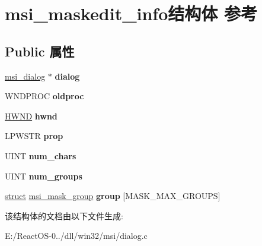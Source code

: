 \hypertarget{structmsi__maskedit__info}{}\section{msi\+\_\+maskedit\+\_\+info结构体 参考}
\label{structmsi__maskedit__info}
\subsection*{Public 属性}
\begin{DoxyCompactItemize}
\item 
\mbox{\label{structmsi__maskedit__info_a68fb34ce5ce1df7808c1a757143a99c0}} 
\hyperlink{structmsi__dialog__tag}{msi\+\_\+dialog} $\ast$ {\bfseries dialog}
\item 
\mbox{\label{structmsi__maskedit__info_a80ae6863e2e7d09501b8bca104b6f346}} 
W\+N\+D\+P\+R\+OC {\bfseries oldproc}
\item 
\mbox{\label{structmsi__maskedit__info_a14ae5d4fe284b729fadc5fe37539e6c1}} 
\hyperlink{interfacevoid}{H\+W\+ND} {\bfseries hwnd}
\item 
\mbox{\label{structmsi__maskedit__info_a30f2e6b4334fc421293b0c61132a897a}} 
L\+P\+W\+S\+TR {\bfseries prop}
\item 
\mbox{\label{structmsi__maskedit__info_a06a2e609c72853354b1ae26c1634f16f}} 
U\+I\+NT {\bfseries num\+\_\+chars}
\item 
\mbox{\label{structmsi__maskedit__info_aecac5ac6e658890fade3baa3f327bde2}} 
U\+I\+NT {\bfseries num\+\_\+groups}
\item 
\mbox{\label{structmsi__maskedit__info_a33d918fd7289670cf78f63341b2f25d2}} 
\hyperlink{interfacestruct}{struct} \hyperlink{structmsi__mask__group}{msi\+\_\+mask\+\_\+group} {\bfseries group} \mbox{[}M\+A\+S\+K\+\_\+\+M\+A\+X\+\_\+\+G\+R\+O\+U\+PS\mbox{]}
\end{DoxyCompactItemize}


该结构体的文档由以下文件生成\+:\begin{DoxyCompactItemize}
\item 
E\+:/\+React\+O\+S-\/0../dll/win32/msi/dialog.\+c\end{DoxyCompactItemize}
